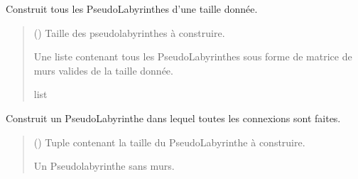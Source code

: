 \documentclass[letterpaper,10pt,french]{sphinxmanual}
\begin{document}
\begin{fulllineitems}
\label{\detokenize{src:src.algorithmes_docs.construit_matrice_labyrinthes}}
\pysigstartsignatures
{}
\pysigstopsignatures
\sphinxAtStartPar
Construit tous les PseudoLabyrinthes d’une taille donnée.
\begin{quote}\begin{description}
\sphinxAtStartPar
{} () \textendash{} Taille des pseudo\sphinxhyphen{}labyrinthes à construire.

\sphinxAtStartPar
Une liste contenant tous les PseudoLabyrinthes sous forme de matrice de murs valides de la taille donnée.

\sphinxAtStartPar
list

\end{description}\end{quote}

\end{fulllineitems}


\begin{fulllineitems}
\label{\detokenize{src:src.algorithmes_docs.construit_pseudo_labyrinthe_vide}}
\pysigstartsignatures
{}
\pysigstopsignatures
\sphinxAtStartPar
Construit un PseudoLabyrinthe dans lequel toutes les connexions sont faites.
\begin{quote}\begin{description}
\sphinxAtStartPar
{} () \textendash{} Tuple contenant la taille du PseudoLabyrinthe à construire.

\sphinxAtStartPar
Un Pseudo\sphinxhyphen{}labyrinthe sans murs.

\sphinxAtStartPar
{\hyperref[\detokenize{src:src.utilites.PseudoLabyrinthe}]{}}

\end{description}\end{quote}

\end{fulllineitems}
\end{document}
